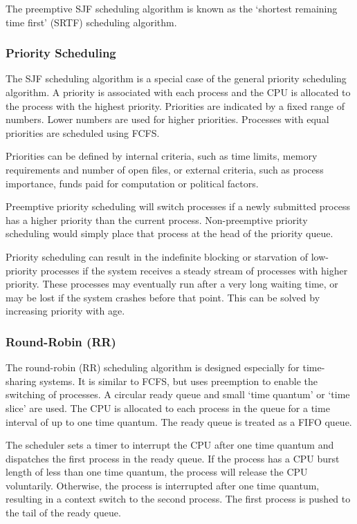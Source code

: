 The preemptive SJF scheduling algorithm is known as the `shortest remaining time first' (SRTF) scheduling algorithm.

\subsubsection{Priority Scheduling}

The SJF scheduling algorithm is a special case of the general priority scheduling algorithm.
A priority is associated with each process and the CPU is allocated to the process with the highest priority.
Priorities are indicated by a fixed range of numbers.
Lower numbers are used for higher priorities.
Processes with equal priorities are scheduled using FCFS.

Priorities can be defined by internal criteria, such as time limits, memory requirements and number of open files, or external criteria, such as process importance, funds paid for computation or political factors.

Preemptive priority scheduling will switch processes if a newly submitted process has a higher priority than the current process.
Non-preemptive priority scheduling would simply place that process at the head of the priority queue.

Priority scheduling can result in the indefinite blocking or starvation of low-priority processes if the system receives a steady stream of processes with higher priority.
These processes may eventually run after a very long waiting time, or may be lost if the system crashes before that point.
This can be solved by increasing priority with age.

\subsubsection{Round-Robin (RR)}

The round-robin (RR) scheduling algorithm is designed especially for time-sharing systems.
It is similar to FCFS, but uses preemption to enable the switching of processes.
A circular ready queue and small `time quantum' or `time slice' are used.
The CPU is allocated to each process in the queue for a time interval of up to one time quantum.
The ready queue is treated as a FIFO queue.

The scheduler sets a timer to interrupt the CPU after one time quantum and dispatches the first process in the ready queue.
If the process has a CPU burst length of less than one time quantum, the process will release the CPU voluntarily.
Otherwise, the process is interrupted after one time quantum, resulting in a context switch to the second process.
The first process is pushed to the tail of the ready queue.

